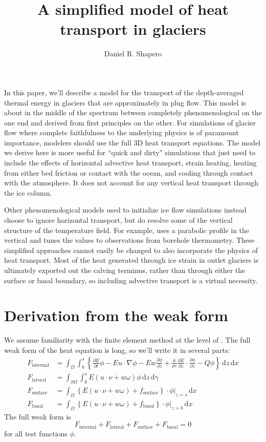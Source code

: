 \documentclass{article}
\title{A simplified model of heat transport in glaciers}
\author{Daniel R. Shapero}
\date{}
\theoremstyle{definition}
\theoremstyle{plain}
\newcommand{\ud}{\hspace{2pt}\mathrm{d}}
\begin{document}
\maketitle

In this paper, we'll describe a model for the transport of the depth-averaged thermal energy in glaciers that are approximately in plug flow.
This model is about in the middle of the spectrum between completely phenomenological on the one end and derived from first principles on the other.
For simulations of glacier flow where complete faithfulness to the underlying physics is of paramount importance, modelers should use the full 3D heat transport equations.
The model we derive here is more useful for ``quick and dirty'' simulations that just need to include the effects of horizontal advective heat transport, strain heating, heating from either bed friction or contact with the ocean, and cooling through contact with the atmosphere.
It does not account for any vertical heat transport through the ice column.

Other phenomenological models used to initialize ice flow simulations instead choose to ignore horizontal transport, but do resolve some of the vertical structure of the temperature field.
For example, \citet{humbert2005parameter} uses a parabolic profile in the vertical and tunes the values to observations from borehole thermometry.
These simplified approaches cannot easily be changed to also incorporate the physics of heat transport.
Most of the heat generated through ice strain in outlet glaciers is ultimately exported out the calving terminus, rather than through either the surface or basal boundary, so including advective transport is a virtual necessity.


\section{Derivation from the weak form}

We assume familiarity with the finite element method at the level of \citet{braess2007finite}.
The full weak form of the heat equation is long, so we'll write it in several parts:
\begin{align}
    F_{\text{internal}} & = \int_\Omega\int_b^s\left\{\frac{\partial E}{\partial t}\phi - E u\cdot\nabla\phi - E w\frac{\partial\phi}{\partial z} + \frac{k}{\rho c}\frac{\partial E}{\partial z}\cdot\frac{\partial\phi}{\partial z} - Q\phi\right\}\ud z\ud x \\
    F_{\text{lateral}} & = \int_{\partial\Omega}\int_b^s E(u\cdot\nu + w\omega)\phi \ud z\ud\gamma \\
    F_{\text{surface}} & = \int_\Omega\left\{E(u\cdot\nu + w\omega) + f_{\text{surface}}\right\}\cdot\phi\Big|_{z = s}\ud x \\
    F_{\text{basal}} & = \int_\Omega\left\{E(u\cdot\nu + w\omega) + f_{\text{basal}}\right\}\cdot\phi\Big|_{z = b}\ud x
\end{align}
The full weak form is
\begin{equation}
    F_{\text{internal}} + F_{\text{lateral}} + F_{\text{surface}} + F_{\text{basal}} = 0
    \label{eq:full-weak-form}
\end{equation}
for all test functions $\phi$.
\end{document}
